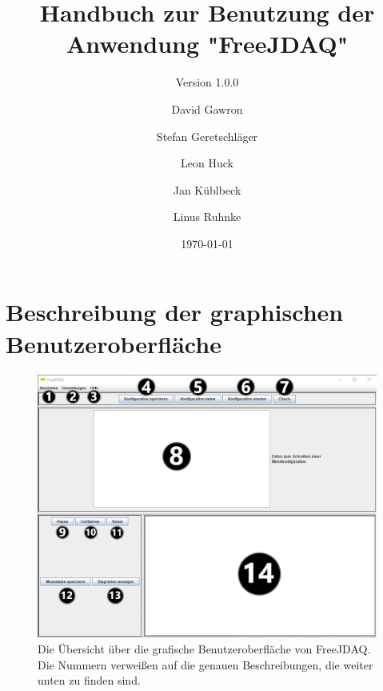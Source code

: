 \documentclass[parskip=full]{scrartcl}
\title{Handbuch zur Benutzung der Anwendung "FreeJDAQ"}
\subtitle{Version 1.0.0}
\author{David Gawron \and Stefan Geretschläger \and Leon Huck \and Jan Küblbeck \and Linus Ruhnke}
\date{\today}
\begin{document}
\maketitle

\clearpage
\tableofcontents 					%

 \clearpage

\section{Beschreibung der graphischen Benutzeroberfläche}

\begin{figure}[htbp]
    \begin{center}
        \includegraphics[width = 14cm]{Grafiken/Uebersicht_GUI_Mit_Nummern.png}
        \caption{Die Übersicht über die grafische Benutzeroberfläche von FreeJDAQ. Die Nummern verweißen auf die genauen Beschreibungen, die weiter unten zu finden sind.}
        \label{Uebersicht_GUI_Mit_Nummern}
    \end{center}
\end{figure}
\end{document}
